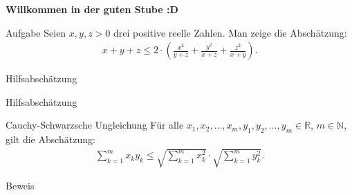\documentclass[10pt]{beamer}
\title{}
\author{Artur's Mathematikstübchen}
\date{}
\def\bN{\mathbb{N}}
\def\bR{\mathbb{R}}
\begin{document}

\begin{frame}
    \begin{center}
        \textbf{\huge Willkommen in der guten Stube \newline \newline :D}
    \end{center}
\end{frame}




\begin{frame}
    \begin{alertblock}{Aufgabe}
        Seien \( x, y, z > 0 \) drei positive reelle Zahlen. Man zeige die Abschätzung:
        \begin{align*}
            x + y + z
            \leq 2 \cdot \left( \frac{x^{2}}{y + z} + \frac{y^{2}}{x + z} + \frac{z^{2}}{x + y} \right).
        \end{align*}
    \end{alertblock}
\end{frame}



\begin{frame}{Hilfsabschätzung}
    
\end{frame}



\begin{frame}{Hilfsabschätzung}
    \begin{block}{Cauchy-Schwarzsche Ungleichung}
        Für alle \( x_{1}, x_{2}, \ldots, x_{m}, y_{1}, y_{2}, \ldots, y_{m} \in \bR \), \( m \in \bN \), gilt die Abschätzung:
        \begin{align*}
            \sum_{k = 1}^{m} x_{k} y_{k}
            \leq \sqrt{\sum_{k = 1}^{m} x_{k}^{2}} \cdot \sqrt{\sum_{k = 1}^{m} y_{k}^{2}}.
        \end{align*}
    \end{block}
\end{frame}



\begin{frame}{Beweis}
    
\end{frame}
\end{document}
